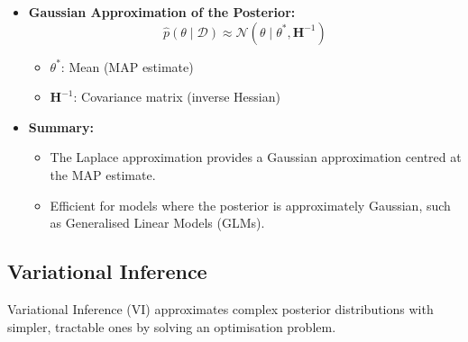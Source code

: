 \begin{itemize}
    \item \textbf{Gaussian Approximation of the Posterior:}
    \[
    \hat{p}(\theta \mid \mathcal{D}) \approx \mathcal{N}(\theta \mid \theta^*, \mathbf{H}^{-1})
    \]
    \begin{itemize}
        \item $\theta^{*}$: Mean (MAP estimate)
        \item $\mathbf{H}^{-1}$: Covariance matrix (inverse Hessian)
    \end{itemize}
    \item \textbf{Summary:}
    \begin{itemize}
        \item The Laplace approximation provides a Gaussian approximation centred at the MAP estimate.
        \item Efficient for models where the posterior is approximately Gaussian, such as Generalised Linear Models (GLMs).
    \end{itemize}
\end{itemize}

\subsection{Variational Inference}

Variational Inference (VI) approximates complex posterior distributions with simpler, tractable ones by solving an optimisation problem.


